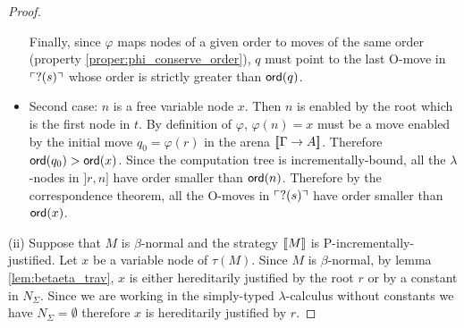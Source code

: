\begin{proof}
\begin{itemize}
Finally, since $\varphi$ maps nodes of a given order to moves of the
same order (property \ref{proper:phi_conserve_order}), $q$ must
point to the last O-move in $\ulcorner ?(s) \urcorner$ whose order is strictly
greater than ${\sf ord}(q)$.


\item  Second case: $n$ is a free variable node $x$. Then $n$ is enabled by the root which is the first node in $t$.
By definition of $\varphi$, $\varphi(n) = x$ must be a move enabled
by the initial move $q_0 = \varphi(r)$ in the arena ${[\![ \Gamma
\rightarrow A ]\!]}$. Therefore ${\sf ord}(q_0) > {\sf ord}(x)$. Since the
computation tree is incrementally-bound, all the $\lambda$-nodes in
$]r,n]$ have order smaller than ${\sf ord}(n)$. Therefore by the
correspondence theorem, all the O-moves in $\ulcorner ?(s) \urcorner$ have order
smaller than ${\sf ord}(x)$.
\end{itemize}



%
%
%
%

\noindent (ii) Suppose that $M$ is $\beta$-normal and the strategy
${[\![ M ]\!]}$ is P-incrementally-justified. Let $x$ be a variable node of
$\tau(M)$. Since $M$ is $\beta$-normal, by lemma
\ref{lem:betaeta_trav}, $x$ is either hereditarily justified by the root $r$ or by a constant in $N_\Sigma$. Since we are working in the simply-typed
$\lambda$-calculus without constants we have $N_\Sigma = \emptyset$ therefore $x$ is
hereditarily justified by $r$.



\end{proof}
